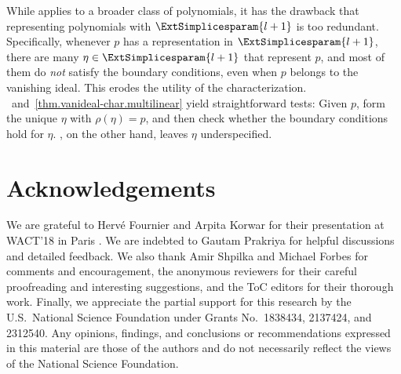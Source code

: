 \documentclass{toc}
\begin{document}
While  applies to a broader class of
polynomials,
it has the drawback that representing polynomials with
\(\ExtSimplicesparam{l+1}\) is too redundant.
Specifically,
whenever \(p\) has a representation in \(\ExtSimplicesparam{l+1}\),
there are many \(\eta\in\ExtSimplicesparam{l+1}\) that represent \(p\),
and most of them do \emph{not} satisfy the boundary conditions,
even when \(p\) belongs to the vanishing ideal.
This erodes the utility of the characterization.
~and~\ref{thm.vanideal-char.multilinear} yield
straightforward tests:
Given \(p\),
form the unique \(\eta\) with \(\rho(\eta)=p\),
and then check whether the boundary conditions hold for \(\eta\).
, on the other hand, leaves \(\eta\) underspecified.

\section*{Acknowledgements}
We are grateful to Herv\'{e} Fournier and Arpita Korwar for their presentation at WACT'18 in Paris \cite{FournierKorwar2018}. 
We are indebted to Gautam Prakriya for helpful discussions and detailed feedback. 
We also thank Amir Shpilka and Michael Forbes for comments and encouragement, the anonymous reviewers for their careful proofreading and interesting suggestions, and the ToC editors for their thorough work.  
%
Finally, we appreciate the partial support for this research by the U.S.\ National Science Foundation under Grants No.\ 1838434, 2137424, and 2312540. Any opinions, findings, and conclusions or recommendations expressed in this material are those of the authors and do not necessarily reflect the views of the National Science Foundation.

%
%

%
%
%



%
%
%
%

\end{document}
